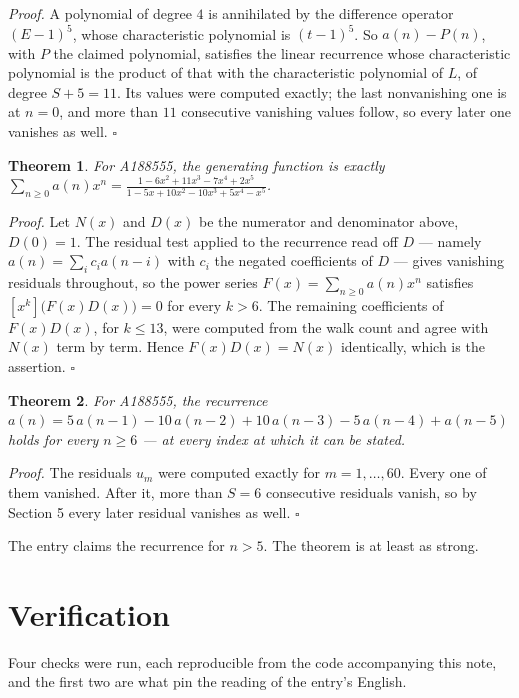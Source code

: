 \documentclass[11pt]{article}
\newtheorem{theorem}{Theorem}
\theoremstyle{definition}
\begin{document}
{\itshape Proof.} A polynomial of degree $4$ is annihilated by the difference operator $(E-1)^{5}$, whose characteristic polynomial is $(t-1)^{5}$. So $a(n) - P(n)$, with $P$ the claimed polynomial, satisfies the linear recurrence whose characteristic polynomial is the product of that with the characteristic polynomial of $L$, of degree $S + 5 = 11$. Its values were computed exactly; the last nonvanishing one is at $n = 0$, and more than $11$ consecutive vanishing values follow, so every later one vanishes as well. $\square$

\begin{theorem} For A188555, the generating function is exactly $\sum_{n\ge 0} a(n)x^n = \frac{1 - 6x^{2} + 11x^{3} - 7x^{4} + 2x^{5}}{1 - 5x + 10x^{2} - 10x^{3} + 5x^{4} - x^{5}}$.\end{theorem}

{\itshape Proof.} Let $N(x)$ and $D(x)$ be the numerator and denominator above, $D(0)=1$. The residual test applied to the recurrence read off $D$ --- namely $a(n) = \sum_i c_i a(n-i)$ with $c_i$ the negated coefficients of $D$ --- gives vanishing residuals throughout, so the power series $F(x)=\sum_{n\ge 0}a(n)x^n$ satisfies $[x^k]\bigl(F(x)D(x)\bigr) = 0$ for every $k > 6$. The remaining coefficients of $F(x)D(x)$, for $k \le 13$, were computed from the walk count and agree with $N(x)$ term by term. Hence $F(x)D(x) = N(x)$ identically, which is the assertion. $\square$

\begin{theorem} For A188555, the recurrence $a(n) = 5\,a(n-1) - 10\,a(n-2) + 10\,a(n-3) - 5\,a(n-4) + a(n-5)$ holds for every $n \ge 6$ --- at every index at which it can be stated.\end{theorem}

{\itshape Proof.} The residuals $u_m$ were computed exactly for $m = 1,\dots,60$. Every one of them vanished. After it, more than $S = 6$ consecutive residuals vanish, so by Section 5 every later residual vanishes as well. $\square$

The entry claims the recurrence for $n > 5$. The theorem is at least as strong.

\section{Verification}

Four checks were run, each reproducible from the code accompanying this note, and the first two are what pin the reading of the entry's English.
\end{document}
